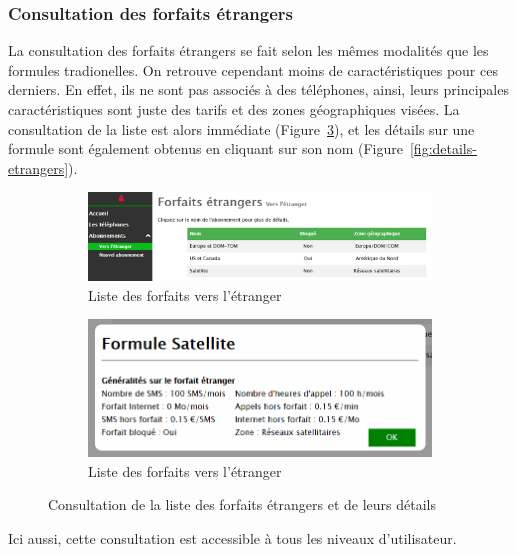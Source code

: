\subsubsection{Consultation des forfaits étrangers}
La consultation des forfaits étrangers se fait selon les mêmes modalités que les formules tradionelles. On retrouve cependant moins de caractéristiques pour ces derniers. En effet, ils ne sont pas associés à des téléphones, ainsi, leurs principales caractéristiques sont juste des tarifs et des zones géographiques visées. La consultation de la liste est alors immédiate (Figure~\ref{fig:liste-etrangers}), et les détails sur une formule sont également obtenus en cliquant sur son nom (Figure~\ref{fig:details-etrangers}).

\begin{figure}[ht]
  \centering
  \begin{subfigure}{.57\textwidth}
    \centering
    \includegraphics[width=\textwidth]{images/Plateforme/liste_etrangers}
    \caption{Liste des forfaits vers l'étranger}
    \label{fig:liste-etrangers}
  \end{subfigure}\hfill%
  \begin{subfigure}{.4\textwidth}
    \centering
    \includegraphics[width=\textwidth]{images/Plateforme/details_etranger}
    \caption{Liste des forfaits vers l'étranger}
    \label{fig:liste-etrangers}
  \end{subfigure}
  \caption{Consultation de la liste des forfaits étrangers et de leurs détails}
\end{figure}

Ici aussi, cette consultation est accessible à tous les niveaux d'utilisateur.

